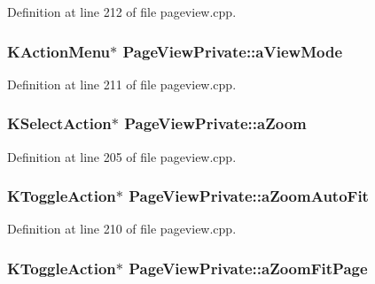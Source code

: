 Definition at line 212 of file pageview.\+cpp.

\hypertarget{classPageViewPrivate_a89d998dea21b24010b2578c6b4f5d9d2}{
\subsubsection[{a\+View\+Mode}]{\setlength{\rightskip}{0pt plus 5cm}K\+Action\+Menu$\ast$ Page\+View\+Private\+::a\+View\+Mode}}\label{classPageViewPrivate_a89d998dea21b24010b2578c6b4f5d9d2}


Definition at line 211 of file pageview.\+cpp.

\hypertarget{classPageViewPrivate_a04f88453f9b09f91cce05b4b6647f2ad}{
\subsubsection[{a\+Zoom}]{\setlength{\rightskip}{0pt plus 5cm}K\+Select\+Action$\ast$ Page\+View\+Private\+::a\+Zoom}}\label{classPageViewPrivate_a04f88453f9b09f91cce05b4b6647f2ad}


Definition at line 205 of file pageview.\+cpp.

\hypertarget{classPageViewPrivate_ad119458f9f75be63ae18c65e86ded044}{
\subsubsection[{a\+Zoom\+Auto\+Fit}]{\setlength{\rightskip}{0pt plus 5cm}K\+Toggle\+Action$\ast$ Page\+View\+Private\+::a\+Zoom\+Auto\+Fit}}\label{classPageViewPrivate_ad119458f9f75be63ae18c65e86ded044}


Definition at line 210 of file pageview.\+cpp.

\hypertarget{classPageViewPrivate_a821a7981295e5366b2f3d489b501ae37}{
\subsubsection[{a\+Zoom\+Fit\+Page}]{\setlength{\rightskip}{0pt plus 5cm}K\+Toggle\+Action$\ast$ Page\+View\+Private\+::a\+Zoom\+Fit\+Page}}\label{classPageViewPrivate_a821a7981295e5366b2f3d489b501ae37}


